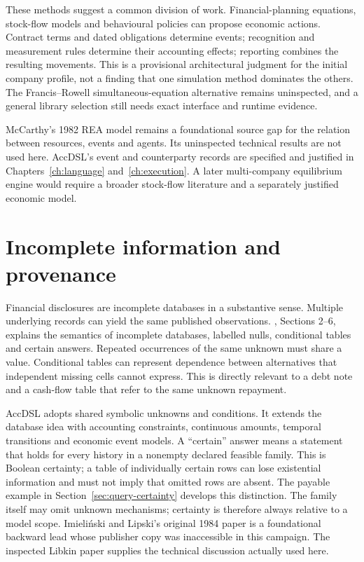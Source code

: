 These methods suggest a common division of work. Financial-planning equations,
stock-flow models and behavioural policies can propose economic actions.
Contract terms and dated obligations determine events; recognition and
measurement rules determine their accounting effects; reporting combines the
resulting movements. This is a provisional architectural judgment for the
initial company profile, not a finding that one simulation method dominates
the others. The Francis--Rowell simultaneous-equation alternative remains
uninspected, and a general library selection still needs exact interface and
runtime evidence.

McCarthy's 1982 REA model remains a foundational source gap for the relation
between resources, events and agents. Its uninspected technical results are
not used here. AccDSL's event and counterparty records are specified and
justified in Chapters~\ref{ch:language} and~\ref{ch:execution}. A later
multi-company equilibrium engine would require a broader stock-flow literature
and a separately justified economic model.

\section{Incomplete information and provenance}

Financial disclosures are incomplete databases in a substantive sense.
Multiple underlying records can yield the same published observations.
\citet{libkin2014}, Sections 2--6, explains the semantics of incomplete
databases, labelled nulls, conditional tables and certain answers. Repeated
occurrences of the same unknown must share a value. Conditional tables can
represent dependence between alternatives that independent missing cells
cannot express. This is directly relevant to a debt note and a cash-flow table
that refer to the same unknown repayment.

AccDSL adopts shared symbolic unknowns and conditions. It extends the database
idea with accounting constraints, continuous amounts, temporal transitions and
economic event models. A ``certain'' answer means a statement that holds for
every history in a nonempty declared feasible family. This is Boolean
certainty; a table of individually certain rows can lose existential
information and must not imply that omitted rows are absent. The payable
example in Section~\ref{sec:query-certainty} develops this distinction.
The family itself may omit
unknown mechanisms; certainty is therefore always relative to a model scope.
Imieliński and Lipski's original 1984 paper is a foundational backward lead
whose publisher copy was inaccessible in this campaign. The inspected Libkin
paper supplies the technical discussion actually used here.

